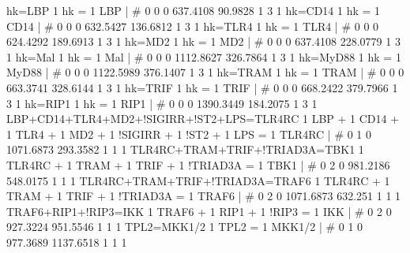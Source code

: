 hk=LBP                                              	1 hk = 1 LBP 	| 	# 	0             0             0      637.4108       90.9828             1             3             1 
hk=CD14                                             	1 hk = 1 CD14 	| 	# 	0             0             0      632.5427      136.6812             1             3             1 
hk=TLR4                                             	1 hk = 1 TLR4 	| 	# 	0             0             0      624.4292      189.6913             1             3             1 
hk=MD2                                              	1 hk = 1 MD2 	| 	# 	0             0             0      637.4108      228.0779             1             3             1 
hk=Mal                                              	1 hk = 1 Mal 	| 	# 	0              0              0      1112.8627       326.7864              1              3              1 
hk=MyD88                                            	1 hk = 1 MyD88 	| 	# 	0              0              0      1122.5989       376.1407              1              3              1 
hk=TRAM                                             	1 hk = 1 TRAM 	| 	# 	0             0             0      663.3741      328.6144             1             3             1 
hk=TRIF                                             	1 hk = 1 TRIF 	| 	# 	0             0             0      668.2422      379.7966             1             3             1 
hk=RIP1                                             	1 hk = 1 RIP1 	| 	# 	0              0              0      1390.3449       184.2075              1              3              1 
LBP+CD14+TLR4+MD2+!SIGIRR+!ST2+LPS=TLR4RC           	1 LBP + 1 CD14 + 1 TLR4 + 1 MD2 + 1 !SIGIRR + 1 !ST2 + 1 LPS = 1 TLR4RC 	| 	# 	0              1              0      1071.6873       293.3582              1              1              1 
TLR4RC+TRAM+TRIF+!TRIAD3A=TBK1                      	1 TLR4RC + 1 TRAM + 1 TRIF + 1 !TRIAD3A = 1 TBK1 	| 	# 	0             2             0      981.2186      548.0175             1             1             1 
TLR4RC+TRAM+TRIF+!TRIAD3A=TRAF6                     	1 TLR4RC + 1 TRAM + 1 TRIF + 1 !TRIAD3A = 1 TRAF6 	| 	# 	0              2              0      1071.6873        632.251              1              1              1 
TRAF6+RIP1+!RIP3=IKK                                	1 TRAF6 + 1 RIP1 + 1 !RIP3 = 1 IKK 	| 	# 	0             2             0      927.3224      951.5546             1             1             1 
TPL2=MKK1/2                                         	1 TPL2 = 1 MKK1/2 	| 	# 	0              1              0       977.3689      1137.6518              1              1              1 
